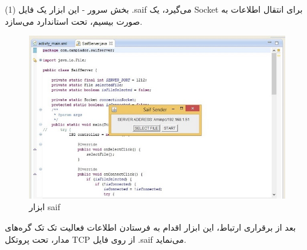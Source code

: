 (1) بخش سرور - این ابزار یک فایل .saif می‌گیرد، یک Socket برای انتقال اطلاعات به صورت بیسیم، تحت استاندارد   می‌سازد.
\begin{figure}
\begin{center}
\includegraphics[scale=0.75]{figs/saifServer.jpg}
\caption{ابزار saif}
\label{fig2}
\end{center}
\end{figure}
 بعد از برقراری ارتباط، این ابزار اقدام به فرستادن اطلاعات فعالیت تک تک گره‌های مدار، تحت پروتکل TCP از روی فایل .saif می‌نماید.
 
